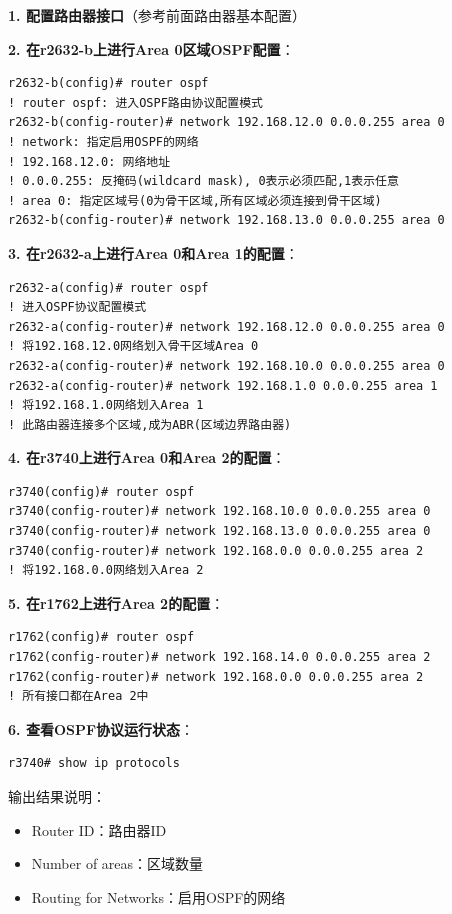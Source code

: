\documentclass[12pt,a4paper]{ctexart}
\begin{document}
\begin{cmdbox}
\textbf{1. 配置路由器接口}（参考前面路由器基本配置）

\textbf{2. 在r2632-b上进行Area 0区域OSPF配置}：
\begin{lstlisting}
r2632-b(config)# router ospf
! router ospf: 进入OSPF路由协议配置模式
r2632-b(config-router)# network 192.168.12.0 0.0.0.255 area 0
! network: 指定启用OSPF的网络
! 192.168.12.0: 网络地址
! 0.0.0.255: 反掩码(wildcard mask), 0表示必须匹配,1表示任意
! area 0: 指定区域号(0为骨干区域,所有区域必须连接到骨干区域)
r2632-b(config-router)# network 192.168.13.0 0.0.0.255 area 0
\end{lstlisting}

\textbf{3. 在r2632-a上进行Area 0和Area 1的配置}：
\begin{lstlisting}
r2632-a(config)# router ospf
! 进入OSPF协议配置模式
r2632-a(config-router)# network 192.168.12.0 0.0.0.255 area 0
! 将192.168.12.0网络划入骨干区域Area 0
r2632-a(config-router)# network 192.168.10.0 0.0.0.255 area 0
r2632-a(config-router)# network 192.168.1.0 0.0.0.255 area 1
! 将192.168.1.0网络划入Area 1
! 此路由器连接多个区域,成为ABR(区域边界路由器)
\end{lstlisting}

\textbf{4. 在r3740上进行Area 0和Area 2的配置}：
\begin{lstlisting}
r3740(config)# router ospf
r3740(config-router)# network 192.168.10.0 0.0.0.255 area 0
r3740(config-router)# network 192.168.13.0 0.0.0.255 area 0
r3740(config-router)# network 192.168.0.0 0.0.0.255 area 2
! 将192.168.0.0网络划入Area 2
\end{lstlisting}

\textbf{5. 在r1762上进行Area 2的配置}：
\begin{lstlisting}
r1762(config)# router ospf
r1762(config-router)# network 192.168.14.0 0.0.0.255 area 2
r1762(config-router)# network 192.168.0.0 0.0.0.255 area 2
! 所有接口都在Area 2中
\end{lstlisting}

\textbf{6. 查看OSPF协议运行状态}：
\begin{lstlisting}
r3740# show ip protocols
\end{lstlisting}

输出结果说明：
\begin{itemize}[itemsep=0pt]
    \item Router ID：路由器ID
    \item Number of areas：区域数量
    \item Routing for Networks：启用OSPF的网络
\end{itemize}


\end{cmdbox}
\end{document}
